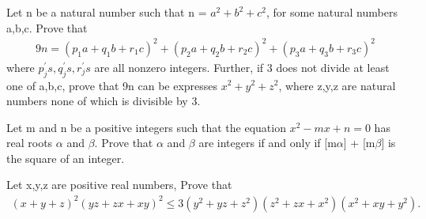 \item Let n be a natural number such that n = $a^{2} + b^{2} + c^{2}$, for some natural numbers a,b,c. Prove that
\begin{align*}
9n = (p_{1}a + q_{1}b + r_{1}c)^{2} + (p_{2}a + q_{2}b + r_{2}c)^{2} + (p_{3}a + q_{3}b + r_{3}c)^{2}
\end{align*}
where $p_{j}^{'}s, q_{j}^{'}s, r_{j}^{'}s$ are all nonzero integers. Further, if 3 does not divide at least one of a,b,c, prove that 9n can be expresses $x^{2} + y^{2} + z^{2}$, where z,y,z are natural numbers none of which is divisible by 3.

\item Let m and n be a positive integers such that the equation $x^{2} - mx + n = 0$ has real roots $\alpha$ and $\beta$. Prove that $\alpha$ and $\beta$ are integers if and only if [m$\alpha$] + [m$\beta$] is the square of an integer.

\item Let x,y,z are positive real numbers, Prove that
\begin{align*}
(x + y + z)^{2}(yz + zx + xy)^{2} \leq 3(y^{2} + yz + z^{2})(z^{2} + zx + x^{2})(x^{2} + xy + y^{2}).
\end{align*}

















